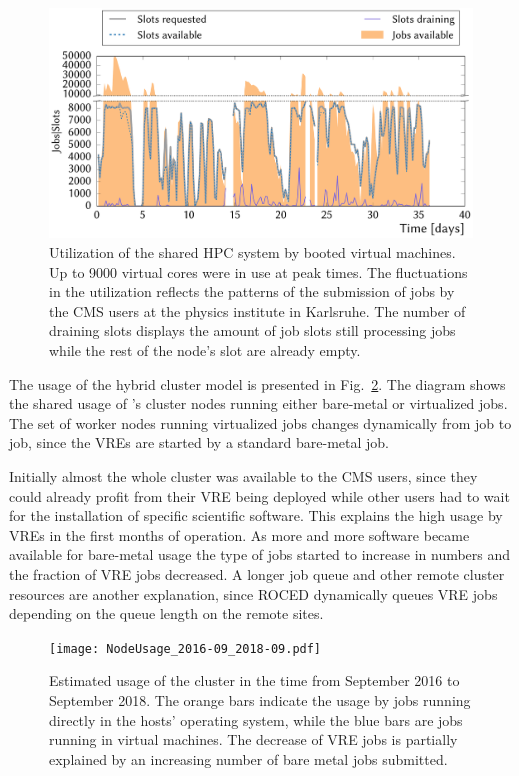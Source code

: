 \begin{figure}
\begin{center}
  \includegraphics[width=1.0\linewidth]{NEMO_KIT_utiliztion.pdf}
  \caption{Utilization of the shared HPC system by booted virtual machines. Up to 9000 virtual cores were in use at peak times. The fluctuations in the utilization reflects the patterns of the submission of jobs by the CMS users at the physics institute in Karlsruhe. The number of draining slots displays the amount of job slots still processing jobs while the rest of the node's slot are already empty.}
  \label{fig-frplots}
\end{center}
\end{figure}

The usage of the hybrid cluster model is presented in Fig.~\ref{fig-nodeusage}.
The diagram shows the shared usage of \NEMO's cluster nodes running either
bare-metal or virtualized jobs. The set of worker nodes running
virtualized jobs changes  dynamically from job to job, since the VREs
are started by a standard bare-metal job.

Initially almost the whole \NEMO  cluster was available to the CMS users,
since they could already profit from their VRE being deployed while
other users had to wait for the installation of specific scientific
software.
This explains the high usage by VREs in the first months of
operation. As more and more software became available for bare-metal usage the
type of jobs started to increase in numbers and the fraction of VRE
jobs decreased. A longer job queue and other remote cluster resources are
another explanation, since ROCED dynamically queues VRE jobs depending on the
queue length on the remote sites.

\begin{figure}
\begin{center}
  \texttt{[image: NodeUsage\_2016-09\_2018-09.pdf]}
  \caption{Estimated usage of the \NEMO cluster in the time from September 2016
    to September 2018. The orange bars indicate the usage by jobs
    running directly in the hosts' operating system, while the blue bars are jobs
    running in virtual machines. The decrease of VRE jobs is partially explained
    by an increasing number of bare metal jobs submitted.}
  \label{fig-nodeusage}
\end{center}
\end{figure}

